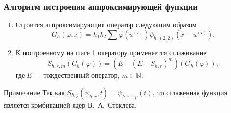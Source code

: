 \documentclass[pdf, 9pt, unicode]{beamer} %
\begin{document}
\begin{frame}
  \frametitle{Алгоритм построения аппроксимирующей функции}
  \begin{enumerate}
  \item 


Строится аппроксимирующий оператор следующим образом
 \begin{equation*}
   G_h(\varphi,x) = h_1 h_2 \sum {\varphi(u^{(l)})\psi_{h,(2,2)}(x-u^{(l)})}.
 \end{equation*}


  \item 
К построенному на шаге 1 оператору применяется сглаживание:
 \begin{equation*}
     S_{h,r,m}(G_{h}(\varphi))=(E-(E-S_{h,r})^m)(G_{h} (\varphi)),
 \end{equation*}
где $E$ --- тождественный оператор, $m \in \mathbb{N}$. 
\end{enumerate}

\begin{block}{Примечание}
Так как
$
S_{h,p}(\psi_{h,r},t) = \psi_{h,r+p}(t),
$
то сглаженная функция является комбинацией ядер В.~А.~Стеклова.
\end{block}
\end{frame}
\end{document}
